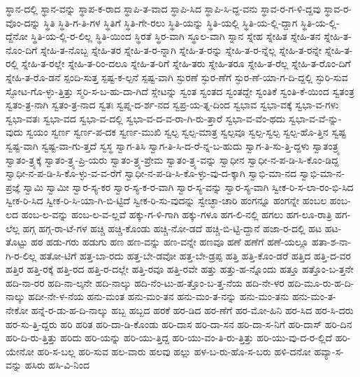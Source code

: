{ಸ್ಥಾನ-ದಲ್ಲಿ
ಸ್ಥಾನ-ವನ್ನು
ಸ್ಥಾಪ-ಕ-ರಾದ
ಸ್ಥಾಪಿ-ತ-ವಾದ
ಸ್ಥಾಪಿ-ಸಿದ
ಸ್ಥಾಪಿ-ಸಿ-ದ್ದ-ವನು
ಸ್ಥಾವ-ರ-ಗ-ಳಿ-ದ್ದವು
ಸ್ಥಾವ-ರ-ವೊಂ-ದನ್ನು
ಸ್ಥಿತಿ
ಸ್ಥಿತಿ-ಗ-ತಿ-ಗಳ
ಸ್ಥಿತಿಗೆ
ಸ್ಥಿತಿ-ಗೇ-ರಲು
ಸ್ಥಿತಿ-ಯನ್ನು
ಸ್ಥಿತಿ-ಯಲ್ಲಿ
ಸ್ಥಿತಿ-ಯ-ಲ್ಲಿ-ದ್ದಾಗ
ಸ್ಥಿತಿ-ಯ-ಲ್ಲಿ-ದ್ದೆನೋ
ಸ್ಥಿತಿ-ಯ-ಲ್ಲಿ-ರ-ಲಿಲ್ಲ
ಸ್ಥಿತಿ-ಯಿಂದ
ಸ್ಥಿರತೆ
ಸ್ಥಿರ-ವಾಗಿ
ಸ್ಥೂಲ-ವಾಗಿ
ಸ್ನಾನ
ಸ್ನೇಹ
ಸ್ನೇಹಿತ
ಸ್ನೇಹಿ-ತನ
ಸ್ನೇಹಿ-ತ-ನೊಂ-ದಿಗೆ
ಸ್ನೇಹಿ-ತ-ನೊಬ್ಬ
ಸ್ನೇಹಿ-ತರ
ಸ್ನೇಹಿ-ತ-ರ-ನ್ನಾಗಿ
ಸ್ನೇಹಿ-ತ-ರನ್ನು
ಸ್ನೇಹಿ-ತ-ರ-ನ್ನೆಲ್ಲ
ಸ್ನೇಹಿ-ತ-ರನ್ನೇ
ಸ್ನೇಹಿ-ತ-ರಲ್ಲಿ
ಸ್ನೇಹಿ-ತ-ರಲ್ಲೇ
ಸ್ನೇಹಿ-ತ-ರಿಂ-ದಲೂ
ಸ್ನೇಹಿ-ತ-ರಿಗೆ
ಸ್ನೇಹಿ-ತರು
ಸ್ನೇಹಿ-ತರೂ
ಸ್ನೇಹಿ-ತ-ರೆಲ್ಲ
ಸ್ನೇಹಿ-ತ-ರೊಂ-ದಿಗೆ
ಸ್ನೇಹಿ-ತ-ರೊ-ಡನೆ
ಸ್ಪಂದಿ-ಸುತ್ತ
ಸ್ಪಷ್ಟ-ಕ-ಲ್ಪನೆ
ಸ್ಪಷ್ಟ-ವಾಗಿ
ಸ್ಫುರಣೆ
ಸ್ಫುರ-ಣೆಗೆ
ಸ್ಫುರ-ಣೆ-ಯಾ-ಗ-ದಿ-ದ್ದಲ್ಲಿ
ಸ್ಫುರಿ-ಸುವ
ಸ್ಫೋಟ-ಗೊ-ಳ್ಳು-ತ್ತಿತ್ತು
ಸ್ಮರಿ-ಸ-ಬ-ಹು-ದಾ-ಗಿದೆ
ಸ್ಲೇಟನ್ನು
ಸ್ವಂತ
ಸ್ವಂತದ
ಸ್ವಂತದ್ದೇ
ಸ್ವಂತಿಕೆ
ಸ್ವಂತಿ-ಕೆ-ಯಿಂದ
ಸ್ವತಂತ್ರ
ಸ್ವತಂ-ತ್ರ-ನಾಗಿ
ಸ್ವತಂ-ತ್ರ-ನಾದ
ಸ್ವತಃ
ಸ್ವಪ್ನ-ದ-ರ್ಶ-ನದ
ಸ್ವಪ್ರ-ಯ-ತ್ನ-ದಿಂದ
ಸ್ವಭಾವ
ಸ್ವಭಾ-ವಕ್ಕೆ
ಸ್ವಭಾ-ವ-ಗಳು
ಸ್ವಭಾ-ವತಃ
ಸ್ವಭಾ-ವದ
ಸ್ವಭಾ-ವ-ದಲ್ಲಿ
ಸ್ವಭಾ-ವ-ದ-ವ-ರಾ-ಗಿ-ರು-ತ್ತಾರೆ
ಸ್ವಭಾ-ವ-ವೆಂ-ಥದು
ಸ್ವಭಾ-ವ-ವೆ-ನ್ನು-ವುದು
ಸ್ವಯಂ
ಸ್ವರ್ಣ
ಸ್ವರ್ಣ-ಪ-ದಕ
ಸ್ವರ್ಣ-ಮುಖಿ
ಸ್ವಲ್ಪ
ಸ್ವಲ್ಪ-ಮಾತ್ರ
ಸ್ವಲ್ಪವೂ
ಸ್ವಲ್ಪ-ಸ್ವಲ್ಪ
ಸ್ವಲ್ಪ-ಹೊ-ತ್ತಿನ
ಸ್ವಷ್ಟ
ಸ್ವಷ್ಟ-ವಾಗಿ
ಸ್ವಷ್ಟ-ವಾ-ಗು-ತ್ತದೆ
ಸ್ವಸ್ಥ
ಸ್ವಾಗ-ತಿಸಿ
ಸ್ವಾಗ-ತಿ-ಸಿ-ದ-ರೆ-ನ್ನ-ಬ-ಹುದು
ಸ್ವಾಗ-ತಿ-ಸು-ತ್ತಿ-ದ್ದಳು
ಸ್ವಾತಂತ್ರ್ಯ
ಸ್ವಾತಂ-ತ್ರ್ಯಕ್ಕೆ
ಸ್ವಾತಂ-ತ್ರ್ಯ-ಪ್ರಿ-ಯರು
ಸ್ವಾತಂ-ತ್ರ್ಯ-ಪ್ರೇಮ
ಸ್ವಾತಂ-ತ್ರ್ಯ-ವನ್ನು
ಸ್ವಾಧೀನ
ಸ್ವಾಧೀ-ನ-ಪ-ಡಿ-ಸಿ-ಕೊಂ-ಡಿದ್ದ
ಸ್ವಾಧೀ-ನ-ಪ-ಡಿ-ಸಿ-ಕೊ-ಳ್ಳು-ವ-ವ-ರೆಗೆ
ಸ್ವಾಧೀ-ನ-ಪ-ಡಿ-ಸಿ-ಕೊ-ಳ್ಳು-ವು-ದ-ಕ್ಕಾಗಿ
ಸ್ವಾಭಿ-ಮಾ-ನದ
ಸ್ವಾಭಿ-ಮಾ-ನ-ಪ್ರಜ್ಞೆ
ಸ್ವಾಮಿ
ಸ್ವಾಮೀ
ಸ್ವಾರ-ಸ್ಯ-ಕರ
ಸ್ವಾರ-ಸ್ಯ-ಕ-ರ-ವಾಗಿ
ಸ್ವಾರ-ಸ್ಯ-ವನ್ನು
ಸ್ವಾರ-ಸ್ಯ-ವಾಗಿ
ಸ್ವೀಕ-ರಿ-ಸ-ಲಾ-ರಂ-ಭಿ-ಸಿದ
ಸ್ವೀಕ-ರಿ-ಸಿದ
ಸ್ವೀಕ-ರಿ-ಸಿ-ಯಾ-ಗಿ-ಬಿ-ಟ್ಟಿದೆ
ಸ್ವೀಕ-ರಿ-ಸು-ವುದನ್ನು
ಸ್ವೇಚ್ಛಾ-ಚಾರಿ
ಹಂಗನ್ನೂ
ಹಂಗನ್ನೇ
ಹಂಬಲ
ಹಂಬ-ಲದ
ಹಂಬ-ಲ-ವನ್ನು
ಹಂಬ-ಲ-ವ-ಲ್ಲವೆ
ಹಕ್ಕು-ಗ-ಳಿ-ಗಾಗಿ
ಹಕ್ಕು-ಗಳೂ
ಹಗ-ಲಿ-ನಲ್ಲಿ
ಹಗಲು
ಹಗ-ಲೂ-ರಾತ್ರಿ
ಹಗ-ಲೆಲ್ಲ
ಹಗ್ಗ
ಹಗ್ಗ-ರಾ-ಟೆ-ಗಳ
ಹಚ್ಚಿ
ಹಚ್ಚಿ-ಕೊಂಡು
ಹಚ್ಚಿ-ನೋ-ಡದೆ
ಹಚ್ಚಿ-ಬಿ-ಟ್ಟಿ-ದ್ದಾನೆ
ಹಜಾ-ರ-ದಲ್ಲಿ
ಹಟ
ಹಟ-ತೊಟ್ಟು
ಹಠ
ಹಡು-ಗರು
ಹಡುಗು
ಹಣ
ಹಣ-ವನ್ನು
ಹಣ-ವನ್ನೇ
ಹಣವೂ
ಹಣೆ
ಹಣೆಗೆ
ಹಣೆ-ಯಲ್ಲೂ
ಹತಾ-ಶ-ನಾ-ಗಿ-ರ-ಲಿಲ್ಲ
ಹತೋ-ಟಿಗೆ
ಹತ್ತ-ಬಾ-ರದು
ಹತ್ತ-ಬೇ-ಡವೋ
ಹತ್ತ-ಬೇ-ಡ್ರಪ್ಪ
ಹತ್ತಿ
ಹತ್ತಿ-ಕೊಂ-ಡರೆ
ಹತ್ತಿದ
ಹತ್ತಿ-ದ-ವರ
ಹತ್ತಿರ
ಹತ್ತಿ-ರಕ್ಕೆ
ಹತ್ತಿ-ರದ
ಹತ್ತಿ-ರ-ದಲ್ಲೇ
ಹತ್ತಿ-ರವೂ
ಹತ್ತಿ-ರವೇ
ಹತ್ತು
ಹತ್ತು-ಹ-ನ್ನೊಂದು
ಹತ್ತೂ
ಹತ್ತೊಂ-ಬ-ತ್ತನೇ
ಹದಿ-ನಾ-ರರ
ಹದಿ-ನಾ-ಲ್ಕನೇ
ಹದಿ-ನಾಲ್ಕು
ಹದಿ-ನೆಂ-ಟು-ಹ-ತ್ತೊಂ-ಬ-ತ್ತ-ನೆಯ
ಹದಿ-ನೇ-ಳರ
ಹದಿ-ಮೂ-ರು-ಹ-ದಿ-ನಾಲ್ಕು
ಹದೀ-ನೇ-ಳ-ನೆಯ
ಹನು-ಮಂತ
ಹನು-ಮಂ-ತನ
ಹನು-ಮಂ-ತ-ನನ್ನು
ಹನು-ಮಂ-ತನು
ಹನು-ಮಂ-ತ-ನೇಕೋ
ಹನ್ನೆ-ರ-ಡು-ಹ-ದಿ-ನಾಲ್ಕು
ಹಬ್ಬ
ಹಬ್ಬದ
ಹರಕೆ
ಹರ-ಡಿದ
ಹರ-ಣೆಗೆ
ಹರ-ಮೋ-ಹಿನಿ
ಹರ-ಸಿದ
ಹರ-ಸಿ-ದರು
ಹರ-ಸು-ತ್ತಿ-ದ್ದರು
ಹರಿ
ಹರಿತ
ಹರಿ-ದಾ-ಡಿ-ಕೊಂಡು
ಹರಿ-ದಾಸ
ಹರಿ-ದಾ-ಸನ
ಹರಿ-ದಾ-ಸ-ನಿಗೆ
ಹರಿ-ದಾಸ್
ಹರಿ-ದಿನ
ಹರಿ-ದಿ-ರು-ತ್ತಿತ್ತು
ಹರಿದು
ಹರಿ-ಯನ್ನು
ಹರಿ-ಯು-ತ್ತಿದ್ದ
ಹರಿ-ಯು-ವಂ-ತಿ-ರು-ತ್ತಿತ್ತು
ಹರಿ-ಯು-ವು-ದ-ರ-ಲ್ಲಿದೆ
ಹರಿ-ಯೇನೋ
ಹರಿ-ಸ-ಬಲ್ಲ
ಹರಿ-ಸುವ
ಹಲ-ವಾರು
ಹಲವು
ಹಲ್ಲು
ಹಳ-ಬ-ರು-ಹೊ-ಸ-ಬರು
ಹಳಿ-ದನೋ
ಹವ್ಯಾ-ಸ-ವನ್ನು
ಹಸಿರು
ಹಸಿ-ವಿ-ನಿಂದ
}

